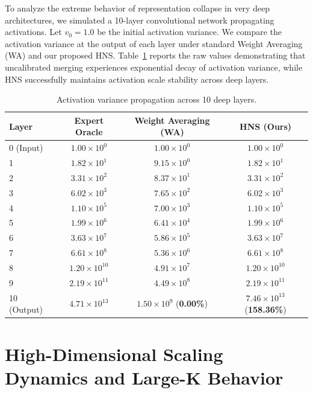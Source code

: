 \documentclass{article}
\theoremstyle{plain}
\theoremstyle{definition}
\theoremstyle{remark}
\begin{document}
To analyze the extreme behavior of representation collapse in very deep architectures, we simulated a 10-layer convolutional network propagating activations. Let $v_0 = 1.0$ be the initial activation variance. We compare the activation variance at the output of each layer under standard Weight Averaging (WA) and our proposed HNS. Table~\ref{tab:deep_variance} reports the raw values demonstrating that uncalibrated merging experiences exponential decay of activation variance, while HNS successfully maintains activation scale stability across deep layers.

\begin{table}[h]
  \caption{Activation variance propagation across 10 deep layers.}
  \label{tab:deep_variance}
  \centering
  \begin{tabular}{lccc}
    \toprule
    \textbf{Layer} & \textbf{Expert Oracle} & \textbf{Weight Averaging (WA)} & \textbf{HNS (Ours)} \\
    \midrule
    0 (Input) & $1.00 \times 10^0$ & $1.00 \times 10^0$ & $1.00 \times 10^0$ \\
    1 & $1.82 \times 10^1$ & $9.15 \times 10^0$ & $1.82 \times 10^1$ \\
    2 & $3.31 \times 10^2$ & $8.37 \times 10^1$ & $3.31 \times 10^2$ \\
    3 & $6.02 \times 10^3$ & $7.65 \times 10^2$ & $6.02 \times 10^3$ \\
    4 & $1.10 \times 10^5$ & $7.00 \times 10^3$ & $1.10 \times 10^5$ \\
    5 & $1.99 \times 10^6$ & $6.41 \times 10^4$ & $1.99 \times 10^6$ \\
    6 & $3.63 \times 10^7$ & $5.86 \times 10^5$ & $3.63 \times 10^7$ \\
    7 & $6.61 \times 10^8$ & $5.36 \times 10^6$ & $6.61 \times 10^8$ \\
    8 & $1.20 \times 10^{10}$ & $4.91 \times 10^7$ & $1.20 \times 10^{10}$ \\
    9 & $2.19 \times 10^{11}$ & $4.49 \times 10^8$ & $2.19 \times 10^{11}$ \\
    10 (Output) & $4.71 \times 10^{13}$ & $1.50 \times 10^9$ \quad (\textbf{0.00\%}) & $7.46 \times 10^{13}$ \quad (\textbf{158.36\%}) \\
    \bottomrule
  \end{tabular}
\end{table}

\section{High-Dimensional Scaling Dynamics and Large-K Behavior}
\label{app:large_k_scaling}
\end{document}
